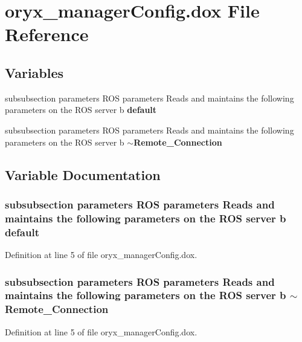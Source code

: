 \section{oryx\-\_\-manager\-Config.\-dox \-File \-Reference}
\label{oryx__managerConfig_8dox}
\subsection*{\-Variables}
\begin{DoxyCompactItemize}
\item 
subsubsection parameters \-R\-O\-S \*
parameters \-Reads and maintains \*
the following parameters on \*
the \-R\-O\-S server b {\bf default}
\item 
subsubsection parameters \-R\-O\-S \*
parameters \-Reads and maintains \*
the following parameters on \*
the \-R\-O\-S server b {\bf $\sim$\-Remote\-\_\-\-Connection}
\end{DoxyCompactItemize}


\subsection{\-Variable \-Documentation}
\subsubsection[{default}]{\setlength{\rightskip}{0pt plus 5cm}subsubsection parameters \-R\-O\-S parameters \-Reads and maintains the following parameters on the \-R\-O\-S server b {\bf default}}\label{oryx__managerConfig_8dox_a94d02332ecf13e7845f06fe8c343e101}


\-Definition at line 5 of file oryx\-\_\-manager\-Config.\-dox.

\subsubsection[{$\sim$\-Remote\-\_\-\-Connection}]{\setlength{\rightskip}{0pt plus 5cm}subsubsection parameters \-R\-O\-S parameters \-Reads and maintains the following parameters on the \-R\-O\-S server b $\sim$\-Remote\-\_\-\-Connection}\label{oryx__managerConfig_8dox_ab21e6eebe4ccb1f6ef97214543950991}


\-Definition at line 5 of file oryx\-\_\-manager\-Config.\-dox.

